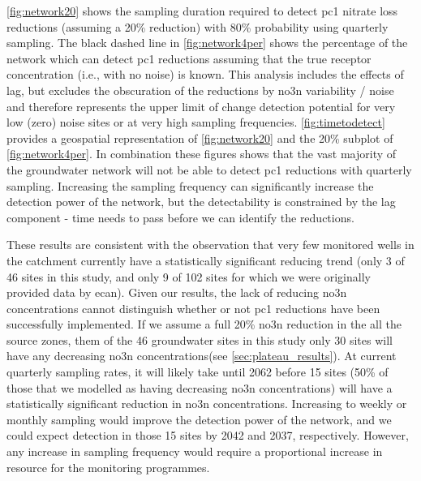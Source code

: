 \autoref{fig:network20} shows the sampling duration required to detect \gls{pc1} nitrate loss reductions (assuming a 20\% reduction) with 80\% probability using quarterly sampling.
The black dashed line in \autoref{fig:network4per} shows the percentage of the network which can detect \gls{pc1} reductions assuming that the true receptor concentration (i.e., with no noise) is known.
This analysis includes the effects of lag, but excludes the obscuration of the reductions by \gls{no3n} variability / noise and therefore represents the upper limit of change detection potential for very low (zero) noise sites or at very high sampling frequencies.
\autoref{fig:timetodetect} provides a geospatial representation of \autoref{fig:network20} and the 20\% subplot of \autoref{fig:network4per}.
In combination these figures shows that the vast majority of the groundwater network will not be able to detect \gls{pc1} reductions with quarterly sampling.
Increasing the sampling frequency can significantly increase the detection power of the network, but the detectability is constrained by the lag component - time needs to pass before we can identify the reductions.

These results are consistent with the observation that very few monitored wells in the catchment currently have a statistically significant reducing trend (only 3 of 46 sites in this study, and only 9 of 102 sites for which we were originally provided data by \gls{ecan}).
Given our results, the lack of reducing \gls{no3n} concentrations cannot distinguish whether or not \gls{pc1} reductions have been successfully implemented.
If we assume a full 20\% \gls{no3n} reduction in the all the source zones, them of the 46 groundwater sites in this study only 30 sites will have any decreasing \gls{no3n} concentrations(see \autoref{sec:plateau_results}).
At current quarterly sampling rates, it will likely take until 2062 before 15 sites (50\% of those that we modelled as having decreasing \gls{no3n} concentrations) will have a statistically significant reduction in \gls{no3n} concentrations.
Increasing to weekly or monthly sampling would improve the detection power of the network, and we could expect detection in those 15 sites by 2042 and 2037, respectively.
However, any increase in sampling frequency would require a proportional increase in resource for the monitoring programmes.

